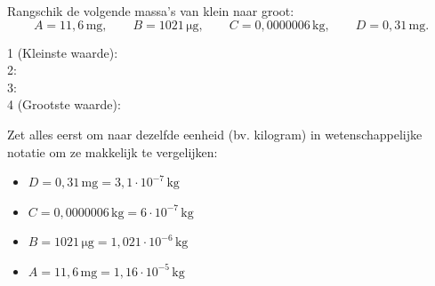 \documentclass{ximera}
\begin{document}
\begin{exercise}
    Rangschik de volgende massa's van klein naar groot: 
    \[ A = 11{,}6 \, \mathrm{mg}, \qquad B = 1021 \, \mathrm{\mu g}, \qquad C = 0{,}0000006 \, \mathrm{kg}, \qquad D = 0{,}31 \, \mathrm{mg}. \]
    
    1 (Kleinste waarde):  \\
    2:  \\
    3:  \\
    4 (Grootste waarde): 
    
    \begin{solution}
        Zet alles eerst om naar dezelfde eenheid (bv. kilogram) in wetenschappelijke notatie om ze makkelijk te vergelijken:
        \begin{itemize}
        \item $D = 0{,}31 \, \mathrm{mg} = 3{,}1 \cdot 10^{-7} \, \mathrm{kg}$
        \item $C = 0{,}0000006 \, \mathrm{kg} = 6 \cdot 10^{-7} \, \mathrm{kg}$
        \item $B = 1021 \, \mathrm{\mu g} = 1{,}021 \cdot 10^{-6} \, \mathrm{kg}$
        \item $A = 11{,}6 \, \mathrm{mg} = 1{,}16 \cdot 10^{-5} \, \mathrm{kg}$
        \end{itemize}
    \end{solution}
\end{exercise}
\end{document}
